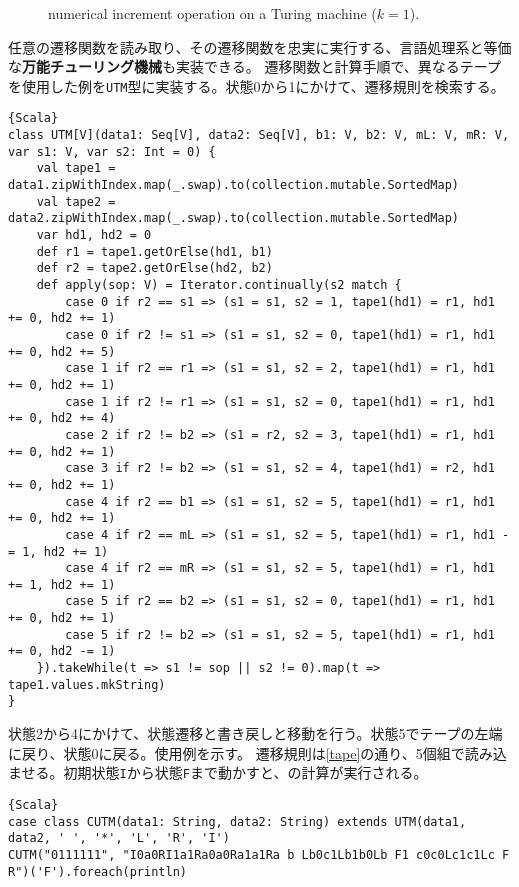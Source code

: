 \documentclass[10pt,a4paper]{book}
\begin{document}
\begin{figure}[h]
\centering
{}
\caption{numerical increment operation on a Turing machine ($k=1$).\label{fig:tape}}
\end{figure}

任意の遷移関数を読み取り、その遷移関数を忠実に実行する、言語処理系と等価な\textbf{万能チューリング機械}も実装できる。
遷移関数と計算手順で、異なるテープを使用した例を\texttt{UTM}型に実装する。状態0から1にかけて、遷移規則を検索する。

\begin{Verbatim}{Scala}
class UTM[V](data1: Seq[V], data2: Seq[V], b1: V, b2: V, mL: V, mR: V, var s1: V, var s2: Int = 0) {
	val tape1 = data1.zipWithIndex.map(_.swap).to(collection.mutable.SortedMap)
	val tape2 = data2.zipWithIndex.map(_.swap).to(collection.mutable.SortedMap)
	var hd1, hd2 = 0
	def r1 = tape1.getOrElse(hd1, b1)
	def r2 = tape2.getOrElse(hd2, b2)
	def apply(sop: V) = Iterator.continually(s2 match {
		case 0 if r2 == s1 => (s1 = s1, s2 = 1, tape1(hd1) = r1, hd1 += 0, hd2 += 1)
		case 0 if r2 != s1 => (s1 = s1, s2 = 0, tape1(hd1) = r1, hd1 += 0, hd2 += 5)
		case 1 if r2 == r1 => (s1 = s1, s2 = 2, tape1(hd1) = r1, hd1 += 0, hd2 += 1)
		case 1 if r2 != r1 => (s1 = s1, s2 = 0, tape1(hd1) = r1, hd1 += 0, hd2 += 4)
		case 2 if r2 != b2 => (s1 = r2, s2 = 3, tape1(hd1) = r1, hd1 += 0, hd2 += 1)
		case 3 if r2 != b2 => (s1 = s1, s2 = 4, tape1(hd1) = r2, hd1 += 0, hd2 += 1)
		case 4 if r2 == b1 => (s1 = s1, s2 = 5, tape1(hd1) = r1, hd1 += 0, hd2 += 1)
		case 4 if r2 == mL => (s1 = s1, s2 = 5, tape1(hd1) = r1, hd1 -= 1, hd2 += 1)
		case 4 if r2 == mR => (s1 = s1, s2 = 5, tape1(hd1) = r1, hd1 += 1, hd2 += 1)
		case 5 if r2 == b2 => (s1 = s1, s2 = 0, tape1(hd1) = r1, hd1 += 0, hd2 += 1)
		case 5 if r2 != b2 => (s1 = s1, s2 = 5, tape1(hd1) = r1, hd1 += 0, hd2 -= 1)
	}).takeWhile(t => s1 != sop || s2 != 0).map(t => tape1.values.mkString)
}
\end{Verbatim}

状態2から4にかけて、状態遷移と書き戻しと移動を行う。状態5でテープの左端に戻り、状態0に戻る。使用例を示す。
遷移規則は\eqref{tape}の通り、5個組で読み込ませる。初期状態\texttt{I}から状態\texttt{F}まで動かすと、の計算が実行される。

\begin{Verbatim}{Scala}
case class CUTM(data1: String, data2: String) extends UTM(data1, data2, ' ', '*', 'L', 'R', 'I')
CUTM("0111111", "I0a0RI1a1Ra0a0Ra1a1Ra b Lb0c1Lb1b0Lb F1 c0c0Lc1c1Lc F R")('F').foreach(println)
\end{Verbatim}
\end{document}
